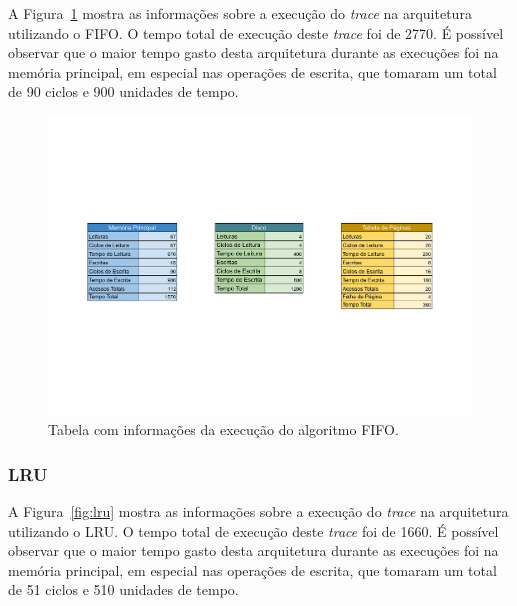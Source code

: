 \documentclass[
	12pt,				%
	oneside,   	        %
	a4paper,			%
	english,			%
	french,				%
	spanish,			%
	brazil,				%
	]{pacotes/abntex2}
\begin{document}
A Figura~\ref{fig:fifo} mostra as informações sobre a execução do \textit{trace} na arquitetura utilizando o FIFO. O tempo total de execução deste \textit{trace} foi de 2770.
É possível observar que o maior tempo gasto desta arquitetura durante as execuções foi na memória principal, em especial nas operações de escrita, que tomaram um total de 90 ciclos e 900 unidades de tempo.

\begin{figure}[H]
  \centering
  \includegraphics[scale=0.5]{figuras/FIFO-TLB(none).pdf}
  \caption{Tabela com informações da execução do algoritmo FIFO.}
  \label{fig:fifo}
\end{figure}

\subsubsection{LRU}
\label{subsubsec:lru}

A Figura~\ref{fig:lru} mostra as informações sobre a execução do \textit{trace} na arquitetura utilizando o LRU. O tempo total de execução deste \textit{trace} foi de 1660.
É possível observar que o maior tempo gasto desta arquitetura durante as execuções foi na memória principal, em especial nas operações de escrita, que tomaram um total de 51 ciclos e 510 unidades de tempo.
\end{document}
